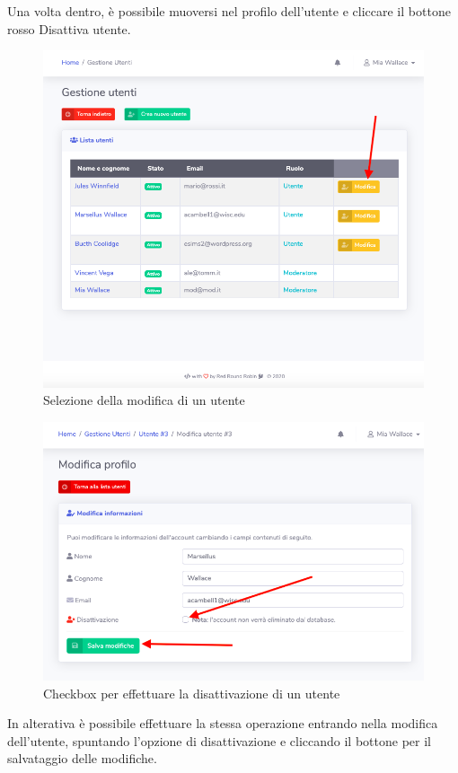 	Una volta dentro, è possibile muoversi nel profilo dell'utente e cliccare il bottone rosso Disattiva utente.
		\begin{figure}[H]
		\centering
		\includegraphics[scale=0.600]{res/images/mod/selModUtente.png}
		\caption{Selezione della modifica di un utente}
	\end{figure}
		\begin{figure}[H]
		\centering
		\includegraphics[scale=0.600]{res/images/mod/disattUtente.png}
		\caption{Checkbox per effettuare la disattivazione di un utente}
	\end{figure}
	In alterativa è possibile effettuare la stessa operazione entrando nella modifica dell'utente, spuntando l'opzione di disattivazione e cliccando il bottone per il salvataggio delle modifiche. 
